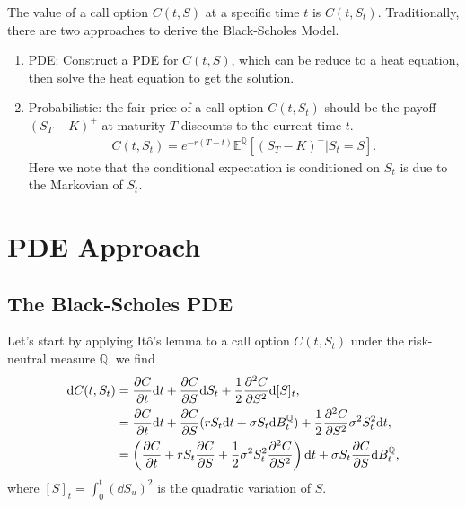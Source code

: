 \documentclass{book}
\begin{document}
The value of a call option $C(t,S)$ at a specific time $t$ is $C(t, S_t)$. Traditionally, there are two approaches to derive the Black-Scholes Model.
\begin{enumerate}
    \item PDE: Construct a PDE for $C(t,S)$, which can be reduce to a heat equation, then solve the heat equation to get the solution.
    \item Probabilistic: the fair price of a call option $C(t, S_t)$ should be the payoff $(S_T-K)^+$ at maturity $T$ discounts to the current time $t$.
    \begin{align}
        C(t, S_t) = e^{-r (T-t)} \mathbb{E}^{\mathbb{Q}}[(S_T-K)^+ | S_t = S].
        \label{eqn:BSM:call-as-expect}
    \end{align}
    Here we note that the conditional expectation is conditioned on $S_t$ is due to the Markovian of $S_t$.
\end{enumerate}

\section{PDE Approach}

\subsection{The Black-Scholes PDE}

Let's start by applying Itô’s lemma to a call option $C(t, S_t)$ under the risk-neutral measure $\mathbb{Q}$, we find
\begin{align}
    \dd C(t, S_t) &= \pdv{C}{t} \dd t + \pdv{C}{S} \dd S_t + \frac{1}{2}{\pdv[2]{C}{S}}{\dd} [S]_t, \notag\\
    &= \pdv{C}{t} \dd t + {\pdv{C}{S}} (rS_t \dd t+\sigma S_t \dd B_t^\mathbb{Q}) + \frac{1}{2}{\pdv[2]{C}{S}}\sigma^2 S_t^2 \dd t, \notag\\
    &= \left(\pdv{C}{t} + rS_t {\pdv{C}{S}} + \frac{1}{2} \sigma^2 S_t^2 {\pdv[2]{C}{S}} \right) \dd t + \sigma S_t {\pdv{C}{S}} \dd B_t^\mathbb{Q},
\end{align}
where $[S]_t = \int_0^t (\dd S_u)^2$ is the quadratic variation of $S$. 
\end{document}
